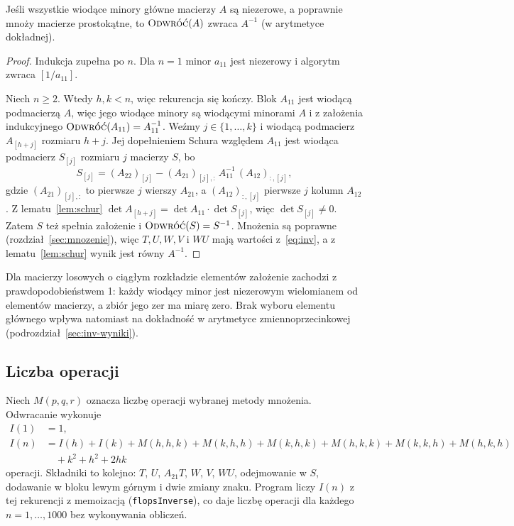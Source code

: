 \begin{tw}\label{tw:inv}
Jeśli wszystkie wiodące minory główne macierzy $A$ są niezerowe, a \Pomnoz{} poprawnie mnoży macierze prostokątne,
to $\Odwroc(A)$ zwraca $A^{-1}$ (w arytmetyce dokładnej).
\end{tw}
\begin{proof}
Indukcja zupełna po $n$. Dla $n=1$ minor $a_{11}$ jest niezerowy i algorytm zwraca $[1/a_{11}]$.

Niech $n\ge2$. Wtedy $h,k<n$, więc rekurencja się kończy. Blok $A_{11}$ jest wiodącą podmacierzą $A$, więc jego
wiodące minory są wiodącymi minorami $A$ i z założenia indukcyjnego $\Odwroc(A_{11})=A_{11}^{-1}$. Weźmy
$j\in\{1,\dots,k\}$ i wiodącą podmacierz $A_{[h+j]}$ rozmiaru $h+j$. Jej dopełnieniem Schura względem $A_{11}$ jest
wiodąca podmacierz $S_{[j]}$ rozmiaru $j$ macierzy $S$, bo
\[
S_{[j]}=(A_{22})_{[j]}-(A_{21})_{[j],:}\,A_{11}^{-1}\,(A_{12})_{:,[j]},
\]
gdzie $(A_{21})_{[j],:}$ to pierwsze $j$ wierszy $A_{21}$, a $(A_{12})_{:,[j]}$ pierwsze $j$ kolumn $A_{12}$.
Z lematu~\ref{lem:schur} $\det A_{[h+j]}=\det A_{11}\cdot\det S_{[j]}$, więc $\det S_{[j]}\ne0$. Zatem $S$ też spełnia
założenie i $\Odwroc(S)=S^{-1}$. Mnożenia są poprawne (rozdział~\ref{sec:mnozenie}), więc
$T,U,W,V$ i $WU$ mają wartości z~\eqref{eq:inv}, a z lematu~\ref{lem:schur} wynik jest równy $A^{-1}$.
\end{proof}

Dla macierzy losowych o ciągłym rozkładzie elementów założenie zachodzi z prawdopodobieństwem 1: każdy wiodący minor
jest niezerowym wielomianem od elementów macierzy, a zbiór jego zer ma miarę zero. Brak wyboru elementu głównego wpływa
natomiast na dokładność w arytmetyce zmiennoprzecinkowej (podrozdział~\ref{sec:inv-wyniki}).

\subsection{Liczba operacji}
Niech $M(p,q,r)$ oznacza liczbę operacji wybranej metody mnożenia. Odwracanie wykonuje
\[
\begin{aligned}
I(1)&=1,\\
I(n)&=I(h)+I(k)+M(h,h,k)+M(k,h,h)+M(k,h,k)+M(h,k,k)+M(k,k,h)+M(h,k,h)\\
    &\quad+k^2+h^2+2hk
\end{aligned}
\]
operacji. Składniki to kolejno: $T$, $U$, $A_{21}T$, $W$, $V$, $WU$, odejmowanie w $S$, dodawanie w bloku lewym
górnym i dwie zmiany znaku. Program liczy $I(n)$ z tej rekurencji z memoizacją (\texttt{flopsInverse}), co daje
liczbę operacji dla każdego $n=1,\dots,1000$ bez wykonywania obliczeń.

